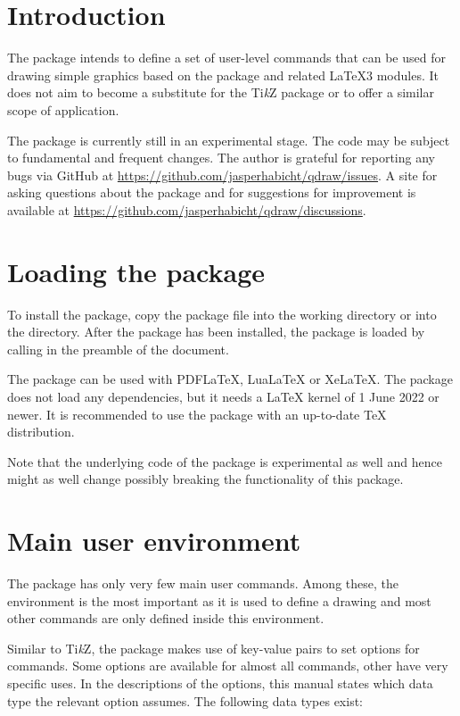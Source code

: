 \documentclass[a4paper]{article}
\begin{document}
\printdoctitle

\bigskip

\section{Introduction}

The package intends to define a set of user-level commands that can be used for drawing simple graphics based on the  package and related LaTeX3 modules. It does not aim to become a substitute for the Ti\emph{k}Z package or to offer a similar scope of application.

The package is currently still in an experimental stage. The code may be subject to fundamental and frequent changes. The author is grateful for reporting any bugs via GitHub at \url{https://github.com/jasperhabicht/qdraw/issues}. A site for asking questions about the package and for suggestions for improvement is available at \url{https://github.com/jasperhabicht/qdraw/discussions}.

\section{Loading the package}

To install the package, copy the package file  into the working directory or into the  directory. After the package has been installed, the  package is loaded by calling \macro{\usepackage{qdraw}} in the preamble of the document.

The package can be used with PDFLaTeX, LuaLaTeX or XeLaTeX. The package does not load any dependencies, but it needs a LaTeX kernel of 1 June 2022 or newer. It is recommended to use the package with an up-to-date TeX distribution.

Note that the underlying code of the  package is experimental as well and hence might as well change possibly breaking the functionality of this package.

\section{Main user environment}

The package has only very few main user commands. Among these, the  environment is the most important as it is used to define a drawing and most other commands are only defined inside this environment.

Similar to Ti\emph{k}Z, the  package makes use of key-value pairs to set options for commands. Some options are available for almost all commands, other have very specific uses. In the descriptions of the options, this manual states which data type the relevant option assumes. The following data types exist:
\end{document}
